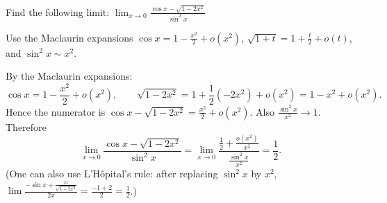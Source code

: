 
\begin{question}
Find the following limit:
$\displaystyle\lim_{x\to0}\frac{\cos x-\sqrt{1-2x^2}}{\sin^2x}$
\end{question}

\begin{hint}
Use the Maclaurin expansions $\cos x=1-\frac{x^2}2+o(x^2)$, $\sqrt{1+t}=1+\frac t2+o(t)$, and $\sin^2x\sim x^2$.
\end{hint}

\begin{solution}
By the Maclaurin expansions:
\[ \cos x=1-\frac{x^2}{2}+o(x^2),\qquad \sqrt{1-2x^2}=1+\frac12(-2x^2)+o(x^2)=1-x^2+o(x^2). \]
Hence the numerator is $\cos x-\sqrt{1-2x^2}=\frac{x^2}{2}+o(x^2)$. Also $\frac{\sin^2x}{x^2}\to1$. Therefore
\[ \lim_{x\to0}\frac{\cos x-\sqrt{1-2x^2}}{\sin^2x}=\lim_{x\to0}\frac{\frac12+\frac{o(x^2)}{x^2}}{\frac{\sin^2x}{x^2}}=\frac12. \]
(One can also use L'Hôpital's rule: after replacing $\sin^2x$ by $x^2$, $\lim\frac{-\sin x+\frac{2x}{\sqrt{1-2x^2}}}{2x}=\frac{-1+2}{2}=\frac12$.)
\end{solution}
